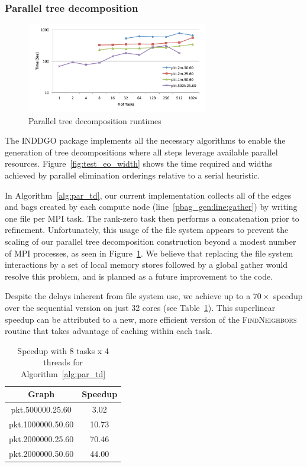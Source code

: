 \documentclass[conference]{IEEEtran}
\begin{document}
\subsubsection{Parallel tree decomposition}\label{sec:exp_td}

\begin{figure}[!ht]
\includegraphics[angle=0,width=3.1in]{figures/newfig8_col.pdf}
\caption{Parallel tree decomposition runtimes }
\label{fig:TDtimes}
\end{figure}

The INDDGO package implements all the necessary algorithms to
enable the generation of tree decompositions where all steps leverage available parallel resources. Figure~\ref{fig:test_eo_width} shows the time required and widths achieved by parallel elimination orderings relative to a serial heuristic.

In Algorithm~\ref{alg:par_td}, our current implementation collects all of the
edges and bags created by each compute node (line~\ref{pbag_gen:line:gather})
by writing one file per MPI task.  The rank-zero task then performs a concatenation
prior to refinement. Unfortunately, this usage of the file system appears to prevent the scaling of our
parallel tree decomposition construction beyond a modest number of MPI processes, as seen in Figure~\ref{fig:TDtimes}.
We believe that replacing the file system interactions by a set of local memory stores followed by a global gather would resolve this problem, and is planned as a future improvement to the code.

Despite the delays inherent from file system use, we achieve up to a $70\times$
speedup over the sequential version on just 32 cores (see Table~\ref{tbl:td_scale}).
This superlinear speedup can be attributed to a new, more efficient version of the \textsc{FindNeighbors} routine
that takes advantage of caching within each task.

\begin{table}
\centering
\begin{tabular}{|c|c|}
\hline
Graph & Speedup \\
\hline
pkt.500000.25.60 & 3.02\\
pkt.1000000.50.60 & 10.73\\
pkt.2000000.25.60 & 70.46\\
pkt.2000000.50.60 & 44.00\\
\hline
\end{tabular}
\caption{Speedup with 8 tasks x 4 threads for Algorithm~\ref{alg:par_td}}
\label{tbl:td_scale}
\end{table}
\end{document}
